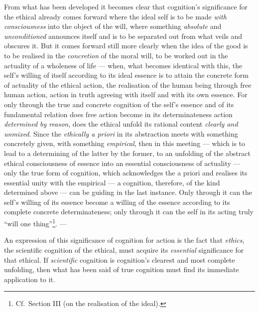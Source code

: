 \documentclass[12pt,a4paper]{book}
\begin{document}
From what has been developed it becomes clear that cognition's significance
for the ethical already comes forward where the ideal self is to be made
\emph{with consciousness} into the object of the will, where something
\emph{absolute} and \emph{unconditioned} announces itself and is to be
separated out from what veils and obscures it. But it comes forward still more
clearly when the idea of the good is to be realised in the \emph{concretion}
of the moral will, to be worked out in the actuality of a wholeness of life
--- when, what becomes identical with this, the self's willing of itself
according to its ideal essence is to attain the concrete form of actuality of
the ethical action, the realisation of the human being through free human
action, action in truth agreeing with itself and with its own essence. For
only through the true and concrete cognition of the self's essence and of its
fundamental relation does free action become in its determinateness action
\emph{determined by reason}, does the ethical unfold its rational content
\emph{clearly and unmixed}. Since the \emph{ethically a priori} in its
abstraction meets with something concretely given, with something
\emph{empirical}, then in this meeting --- which is to lead to a determining
of the latter by the former, to an unfolding of the abstract ethical
consciousness of essence into an essential consciousness of actuality --- only
the true form of cognition, which acknowledges the
\setcounter{footnote}{0}%
a priori and realises its essential unity with the empirical --- a cognition,
therefore, of the kind determined above --- can be guiding in the last
instance. Only through it can the self's willing of its essence become a
willing of the essence according to its complete concrete determinateness;
only through it can the self in its acting truly ``will one
thing''\footnote{Cf.\ Section III (on the realisation of the ideal).}. ---

An expression of this significance of cognition for action is the fact that
\emph{ethics}, the scientific cognition of the ethical, must acquire its
\emph{essential} significance for that ethical. If \emph{scientific} cognition
is cognition's clearest and most complete unfolding, then what has been said
of true cognition must find its immediate application to it.
\end{document}
